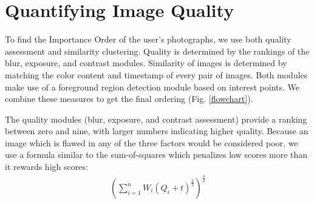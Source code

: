\documentclass{article}
\begin{document}


\section{Quantifying Image Quality}
\begin{figure*}
  \centering
  \caption{Interest points are used to find the foreground subject. Blur, contrast, and exposure assessment algorithms are used to calculate an image's quality rating. Images are clustered into groups of similar images based on their histograms, color distribution, and timestamps. A reordering of the input results, allowing the user to remove images at the end of this ordering.}
  \label{flowchart}
\end{figure*}

To find the Importance Order of the user's photographs, we use both quality assessment and similarity clustering. Quality is determined by the rankings of the blur, exposure, and contrast modules. Similarity of images is determined by matching the color content and timestamp of every pair of images. Both modules make use of a foreground region detection module based on interest points. We combine these measures to get the final ordering (Fig. \ref{flowchart}).

The quality modules (blur, exposure, and contrast assessment) provide a ranking between zero and nine, with larger numbers indicating higher quality. Because an image which is flawed in any of the three factors would be considered poor, we use a formula similar to the sum-of-squares which penalizes low scores more than it rewards high scores:
\begin{eqnarray}
\left(\displaystyle\sum\limits_{i=1}^nW_i\left({Q_i+t}\right)^\frac{2}{3}\right)^\frac{3}{2}
\end{eqnarray}
\end{document}
